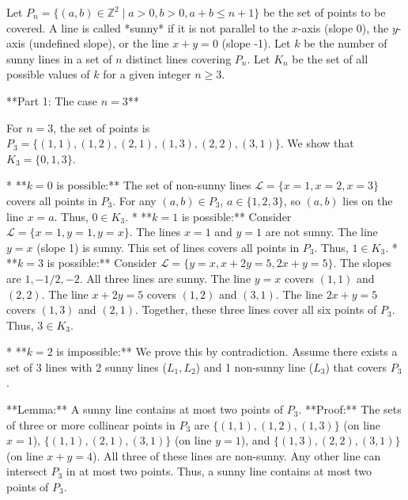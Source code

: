 Let $P_n = \{ (a,b) \in \mathbb{Z}^2 \mid a > 0, b > 0, a+b \le n+1 \}$ be the set of points to be covered. A line is called *sunny* if it is not parallel to the $x$-axis (slope 0), the $y$-axis (undefined slope), or the line $x+y=0$ (slope -1). Let $k$ be the number of sunny lines in a set of $n$ distinct lines covering $P_n$. Let $K_n$ be the set of all possible values of $k$ for a given integer $n \ge 3$.

**Part 1: The case $n=3$**

For $n=3$, the set of points is $P_3 = \{(1,1), (1,2), (2,1), (1,3), (2,2), (3,1)\}$. We show that $K_3 = \{0,1,3\}$.

*   **$k=0$ is possible:** The set of non-sunny lines $\mathcal{L} = \{x=1, x=2, x=3\}$ covers all points in $P_3$. For any $(a,b) \in P_3$, $a \in \{1,2,3\}$, so $(a,b)$ lies on the line $x=a$. Thus, $0 \in K_3$.
*   **$k=1$ is possible:** Consider $\mathcal{L} = \{x=1, y=1, y=x\}$. The lines $x=1$ and $y=1$ are not sunny. The line $y=x$ (slope 1) is sunny. This set of lines covers all points in $P_3$. Thus, $1 \in K_3$.
*   **$k=3$ is possible:** Consider $\mathcal{L} = \{y=x, x+2y=5, 2x+y=5\}$. The slopes are $1, -1/2, -2$. All three lines are sunny. The line $y=x$ covers $(1,1)$ and $(2,2)$. The line $x+2y=5$ covers $(1,2)$ and $(3,1)$. The line $2x+y=5$ covers $(1,3)$ and $(2,1)$. Together, these three lines cover all six points of $P_3$. Thus, $3 \in K_3$.

*   **$k=2$ is impossible:** We prove this by contradiction. Assume there exists a set of 3 lines with 2 sunny lines ($L_1, L_2$) and 1 non-sunny line ($L_3$) that covers $P_3$.

    **Lemma:** A sunny line contains at most two points of $P_3$.
    **Proof:** The sets of three or more collinear points in $P_3$ are $\{(1,1), (1,2), (1,3)\}$ (on line $x=1$), $\{(1,1), (2,1), (3,1)\}$ (on line $y=1$), and $\{(1,3), (2,2), (3,1)\}$ (on line $x+y=4$). All three of these lines are non-sunny. Any other line can intersect $P_3$ in at most two points. Thus, a sunny line contains at most two points of $P_3$.

